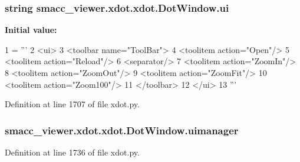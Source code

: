 \subsubsection[{\texorpdfstring{ui}{ui}}]{\setlength{\rightskip}{0pt plus 5cm}string smacc\+\_\+viewer.\+xdot.\+xdot.\+Dot\+Window.\+ui\hspace{0.3cm}{\ttfamily [static]}}\hypertarget{classsmacc__viewer_1_1xdot_1_1xdot_1_1DotWindow_a1b822b14d0fbc1de0ed8382398a9f7f3}{}\label{classsmacc__viewer_1_1xdot_1_1xdot_1_1DotWindow_a1b822b14d0fbc1de0ed8382398a9f7f3}
{\bfseries Initial value\+:}
\begin{DoxyCode}
1 = \textcolor{stringliteral}{'''}
2 \textcolor{stringliteral}{<ui>}
3 \textcolor{stringliteral}{    <toolbar name="ToolBar">}
4 \textcolor{stringliteral}{        <toolitem action="Open"/>}
5 \textcolor{stringliteral}{        <toolitem action="Reload"/>}
6 \textcolor{stringliteral}{        <separator/>}
7 \textcolor{stringliteral}{        <toolitem action="ZoomIn"/>}
8 \textcolor{stringliteral}{        <toolitem action="ZoomOut"/>}
9 \textcolor{stringliteral}{        <toolitem action="ZoomFit"/>}
10 \textcolor{stringliteral}{        <toolitem action="Zoom100"/>}
11 \textcolor{stringliteral}{    </toolbar>}
12 \textcolor{stringliteral}{</ui>}
13 \textcolor{stringliteral}{'''}
\end{DoxyCode}


Definition at line 1707 of file xdot.\+py.

\subsubsection[{\texorpdfstring{uimanager}{uimanager}}]{\setlength{\rightskip}{0pt plus 5cm}smacc\+\_\+viewer.\+xdot.\+xdot.\+Dot\+Window.\+uimanager}\hypertarget{classsmacc__viewer_1_1xdot_1_1xdot_1_1DotWindow_a3a65f7d7acab6b8f2c9f720bfc3389dc}{}\label{classsmacc__viewer_1_1xdot_1_1xdot_1_1DotWindow_a3a65f7d7acab6b8f2c9f720bfc3389dc}


Definition at line 1736 of file xdot.\+py.

